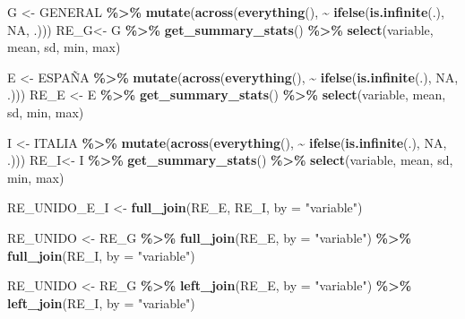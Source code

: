 \documentclass[
]{article}
\newenvironment{Shaded}{\begin{snugshade}}{\end{snugshade}}
\newcommand{\AttributeTok}[1]{\textcolor[rgb]{0.13,0.29,0.53}{#1}}
\newcommand{\ConstantTok}[1]{\textcolor[rgb]{0.56,0.35,0.01}{#1}}
\newcommand{\FunctionTok}[1]{\textcolor[rgb]{0.13,0.29,0.53}{\textbf{#1}}}
\newcommand{\NormalTok}[1]{#1}
\newcommand{\OtherTok}[1]{\textcolor[rgb]{0.56,0.35,0.01}{#1}}
\newcommand{\SpecialCharTok}[1]{\textcolor[rgb]{0.81,0.36,0.00}{\textbf{#1}}}
\newcommand{\StringTok}[1]{\textcolor[rgb]{0.31,0.60,0.02}{#1}}
\begin{document}
\begin{Shaded}
\begin{Highlighting}[]
\NormalTok{G }\OtherTok{\textless{}{-}}\NormalTok{ GENERAL }\SpecialCharTok{\%\textgreater{}\%}
  \FunctionTok{mutate}\NormalTok{(}\FunctionTok{across}\NormalTok{(}\FunctionTok{everything}\NormalTok{(), }\SpecialCharTok{\textasciitilde{}} \FunctionTok{ifelse}\NormalTok{(}\FunctionTok{is.infinite}\NormalTok{(.), }\ConstantTok{NA}\NormalTok{, .)))}
\NormalTok{RE\_G}\OtherTok{\textless{}{-}}\NormalTok{ G }\SpecialCharTok{\%\textgreater{}\%} \FunctionTok{get\_summary\_stats}\NormalTok{() }\SpecialCharTok{\%\textgreater{}\%} \FunctionTok{select}\NormalTok{(variable, mean, sd, min, max)}


\NormalTok{E }\OtherTok{\textless{}{-}}\NormalTok{ ESPAÑA }\SpecialCharTok{\%\textgreater{}\%}
  \FunctionTok{mutate}\NormalTok{(}\FunctionTok{across}\NormalTok{(}\FunctionTok{everything}\NormalTok{(), }\SpecialCharTok{\textasciitilde{}} \FunctionTok{ifelse}\NormalTok{(}\FunctionTok{is.infinite}\NormalTok{(.), }\ConstantTok{NA}\NormalTok{, .)))}
\NormalTok{RE\_E }\OtherTok{\textless{}{-}}\NormalTok{ E }\SpecialCharTok{\%\textgreater{}\%} \FunctionTok{get\_summary\_stats}\NormalTok{() }\SpecialCharTok{\%\textgreater{}\%} \FunctionTok{select}\NormalTok{(variable, mean, sd, min, max)}

\NormalTok{I }\OtherTok{\textless{}{-}}\NormalTok{ ITALIA }\SpecialCharTok{\%\textgreater{}\%}
  \FunctionTok{mutate}\NormalTok{(}\FunctionTok{across}\NormalTok{(}\FunctionTok{everything}\NormalTok{(), }\SpecialCharTok{\textasciitilde{}} \FunctionTok{ifelse}\NormalTok{(}\FunctionTok{is.infinite}\NormalTok{(.), }\ConstantTok{NA}\NormalTok{, .)))}
\NormalTok{RE\_I}\OtherTok{\textless{}{-}}\NormalTok{ I }\SpecialCharTok{\%\textgreater{}\%} \FunctionTok{get\_summary\_stats}\NormalTok{() }\SpecialCharTok{\%\textgreater{}\%} \FunctionTok{select}\NormalTok{(variable, mean, sd, min, max)}

\NormalTok{RE\_UNIDO\_E\_I }\OtherTok{\textless{}{-}} \FunctionTok{full\_join}\NormalTok{(RE\_E, RE\_I, }\AttributeTok{by =} \StringTok{"variable"}\NormalTok{)}

\NormalTok{RE\_UNIDO }\OtherTok{\textless{}{-}}\NormalTok{ RE\_G }\SpecialCharTok{\%\textgreater{}\%}
  \FunctionTok{full\_join}\NormalTok{(RE\_E, }\AttributeTok{by =} \StringTok{"variable"}\NormalTok{) }\SpecialCharTok{\%\textgreater{}\%}
  \FunctionTok{full\_join}\NormalTok{(RE\_I, }\AttributeTok{by =} \StringTok{"variable"}\NormalTok{) }

\NormalTok{RE\_UNIDO }\OtherTok{\textless{}{-}}\NormalTok{ RE\_G }\SpecialCharTok{\%\textgreater{}\%}
  \FunctionTok{left\_join}\NormalTok{(RE\_E, }\AttributeTok{by =} \StringTok{"variable"}\NormalTok{) }\SpecialCharTok{\%\textgreater{}\%}
  \FunctionTok{left\_join}\NormalTok{(RE\_I, }\AttributeTok{by =} \StringTok{"variable"}\NormalTok{) }
\end{Highlighting}
\end{Shaded}
\end{document}
